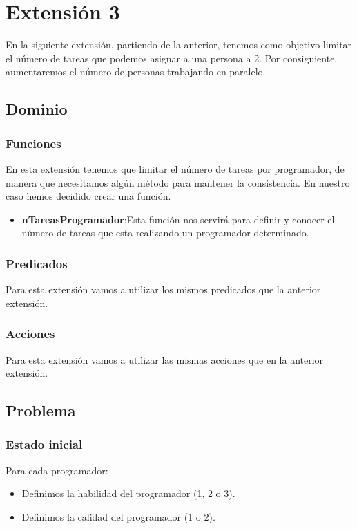 \documentclass[11pt]{article}
\begin{document}
\newpage

\section{Extensión 3}
En la siguiente extensión, partiendo de la anterior, tenemos como objetivo limitar el número de tareas que podemos asignar a una persona a 2. Por consiguiente, aumentaremos el número de personas trabajando en paralelo. 
\subsection{Dominio}
\subsubsection{Funciones}
En esta extensión tenemos que limitar el número de tareas por programador, de manera que necesitamos algún método para mantener la consistencia. En nuestro caso hemos decidido crear una función.
\begin{itemize}
	\item \textbf{nTareasProgramador}:Esta función nos servirá para definir y conocer el número de tareas que esta realizando un programador determinado.  
\end{itemize}
\subsubsection{Predicados}
Para esta extensión vamos a utilizar los mismos predicados que la anterior extensión.
\subsubsection{Acciones}
Para esta extensión vamos a utilizar las mismas acciones que en la anterior extensión.
\subsection{Problema}
\subsubsection{Estado inicial}
Para cada programador:
\begin{itemize}
  	\item Definimos la habilidad del programador (1, 2 o 3).
  	\item Definimos la calidad del programador (1 o 2).
\end{itemize}
\end{document}
